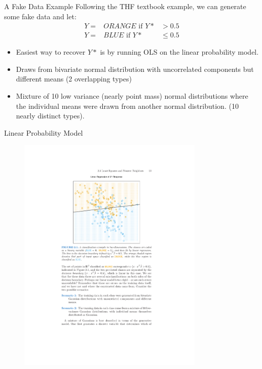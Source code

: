 \documentclass[11pt,handout,xcolor=pdftex,dvipsnames,table,mathserif]{beamer}
\begin{document}
\begin{frame}{A Fake Data Example}
Following the THF textbook example, we can generate some fake data and let: 
\begin{eqnarray*}
Y=&ORANGE \mbox{ if } Y* &> 0.5 \\
Y=&BLUE  \mbox{ if }   Y* &\leq 0.5
\end{eqnarray*}
\begin{itemize}
\item Easiest way to recover $Y*$ is by running OLS on the linear probability model.
\item Draws from bivariate normal distribution with uncorrelated components but different means (2 overlapping types)
\item Mixture of 10 low variance (nearly point mass) normal distributions where the individual means were drawn from another normal distribution. (10 nearly distinct types).
\end{itemize}
\end{frame}

\begin{frame}{Linear Probability Model}
\begin{figure}[htbp]
\begin{center}
\includegraphics[width=3.5in]{./resources/classifierOLS.pdf}
\label{classOLS}
\end{center}
\end{figure}
\end{frame}
\end{document}
